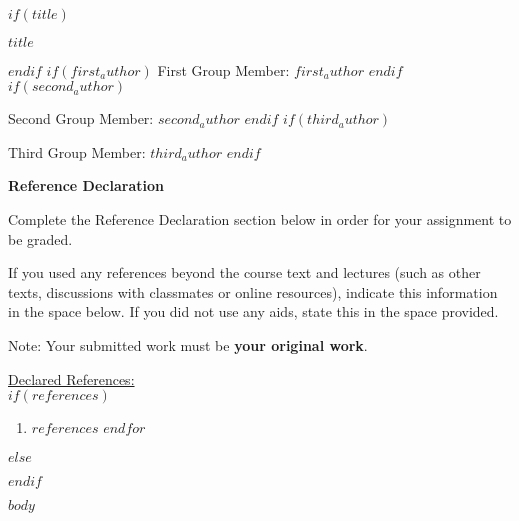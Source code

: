 \documentclass[12pt,oneside]{article}
\begin{document}
\noindent
{}

\par
\vspace{0.015in}\hrulefill\ \\
$if(title)$
\begin{minipage}{\textwidth}
    \centering
    \vspace{0.15in}
    \Large{\bf $title$}\par
    \vspace{0.15in}
\end{minipage}
$endif$
$if(first_author)$
\large{First Group Member: $first_author$}
$endif$
$if(second_author)$
\par
\large{Second Group Member: $second_author$}
$endif$
$if(third_author)$
\par
\large{Third Group Member: $third_author$}
$endif$
\\

\normalsize


\textbf{Reference Declaration}

Complete the Reference Declaration section below in order for your assignment to be graded.

If you used any references beyond the course text and lectures (such as other texts, discussions with classmates or online resources), indicate this information in the space below.  If you did not use any aids, state this in the space provided. 

Note: Your submitted work must be \textbf{your original work}. 

\underline{Declared References:} \\

$if(references)$
\begin{enumerate}
$for(references)$
    \item $references$
$endfor$
\end{enumerate}
$else$
\par
$endif$

\newpage

$body$
\end{document}
